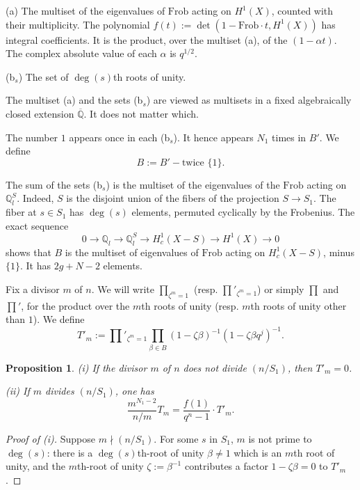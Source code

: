 \documentclass[11pt,a4paper]{article}
\theoremstyle{plain}
\newtheorem{proposition}[theorem]{Proposition}
\theoremstyle{definition}
\newcommand{\Q}{\mathbb{Q}}
\newcommand{\Frob}{\mathrm{Frob}}
\begin{document}
(a) The multiset of the eigenvalues of $\Frob$ acting on $H^1(X)$, counted with their multiplicity. The polynomial $f(t) := \det(1 - \Frob \cdot t, H^1(X))$ has integral coefficients. It is the product, over the multiset (a), of the $(1 - \alpha t)$. The complex absolute value of each $\alpha$ is $q^{1/2}$.

(b$_s$) The set of $\deg(s)$th roots of unity.

The multiset (a) and the sets (b$_s$) are viewed as multisets in a fixed algebraically closed extension $\overline{\Q}$. It does not matter which.

The number $1$ appears once in each (b$_s$). It hence appears $N_1$ times in $B'$. We define
\begin{equation}
B := B' - \text{twice } \{1\}. \tag{6.2.1}
\end{equation}

The sum of the sets (b$_s$) is the multiset of the eigenvalues of the $\Frob$ acting on $\Q_l^S$. Indeed, $S$ is the disjoint union of the fibers of the projection $S \to S_1$. The fiber at $s \in S_1$ has $\deg(s)$ elements, permuted cyclically by the Frobenius. The exact sequence
\begin{equation}
0 \to \Q_l \to \Q_l^S \to H_c^1(X - S) \to H^1(X) \to 0 \tag{6.2.2}
\end{equation}
shows that $B$ is the multiset of eigenvalues of $\Frob$ acting on $H_c^1(X - S)$, minus $\{1\}$. It has $2g + N - 2$ elements.

Fix a divisor $m$ of $n$. We will write $\prod_{\zeta^m=1}$ (resp. $\prod'_{\zeta^m=1}$) or simply $\prod$ and $\prod'$, for the product over the $m$th roots of unity (resp. $m$th roots of unity other than $1$). We define
\begin{equation}
T'_m := \prod'_{\zeta^m=1} \prod_{\beta \in B} (1 - \zeta \beta)^{-1} (1 - \zeta \beta q^j)^{-1}. \tag{6.2.3}
\end{equation}

\begin{proposition}
\emph{(i)} If the divisor $m$ of $n$ does not divide $(n/S_1)$, then $T'_m = 0$.

\emph{(ii)} If $m$ divides $(n/S_1)$, one has
\begin{equation}
\frac{m^{N_1-2}}{n/m} T_m = \frac{f(1)}{q^n - 1} \cdot T'_m. \tag{6.3.1}
\end{equation}
\end{proposition}

\begin{proof}[Proof of (i)]
Suppose $m \nmid (n/S_1)$. For some $s$ in $S_1$, $m$ is not prime to $\deg(s)$: there is a $\deg(s)$th-root of unity $\beta \neq 1$ which is an $m$th root of unity, and the $m$th-root of unity $\zeta := \beta^{-1}$ contributes a factor $1 - \zeta \beta = 0$ to $T'_m$.
\end{proof}
\end{document}
